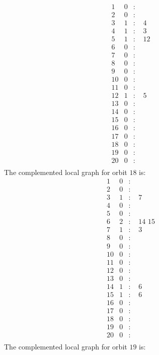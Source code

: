 \documentclass[12pt]{article}
\begin{document}
\begin{equation*}
\begin{array}{rrcl}
1&0&:&\\
2&0&:&\\
3&1&:&\,\,4\\
4&1&:&\,\,3\\
5&1&:&\,\,12\\
6&0&:&\\
7&0&:&\\
8&0&:&\\
9&0&:&\\
10&0&:&\\
11&0&:&\\
12&1&:&\,\,5\\
13&0&:&\\
14&0&:&\\
15&0&:&\\
16&0&:&\\
17&0&:&\\
18&0&:&\\
19&0&:&\\
20&0&:&\\
\end{array}
\end{equation*}
The complemented local graph for orbit $18$ is:
\begin{equation*}
\begin{array}{rrcl}
1&0&:&\\
2&0&:&\\
3&1&:&\,\,7\\
4&0&:&\\
5&0&:&\\
6&2&:&\,\,14\,\,15\\
7&1&:&\,\,3\\
8&0&:&\\
9&0&:&\\
10&0&:&\\
11&0&:&\\
12&0&:&\\
13&0&:&\\
14&1&:&\,\,6\\
15&1&:&\,\,6\\
16&0&:&\\
17&0&:&\\
18&0&:&\\
19&0&:&\\
20&0&:&\\
\end{array}
\end{equation*}
The complemented local graph for orbit $19$ is:
\end{document}
